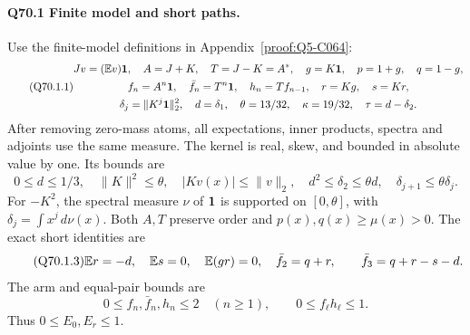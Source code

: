 \paragraph{Q70.1 Finite model and short paths.}
Use the finite-model definitions in Appendix~\ref{proof:Q5-C064}:
\begin{equation}\tag{Q70.1.1}\label{eq:Q70:1.1}
\begin{gathered}
Jv=(\mathbb E v)\mathbf1,\quad A=J+K,\quad T=J-K=A^*,\quad
g=K\mathbf1,\quad p=1+g,\quad q=1-g,\\
f_n=A^n\mathbf1,\quad\bar f_n=T^n\mathbf1,\quad h_n=Tf_{n-1},
\quad r=Kg,\quad s=Kr,\\
\delta_j=\|K^j\mathbf1\|_2^2,\quad d=\delta_1,\quad
\theta=13/32,\quad\kappa=19/32,\quad\tau=d-\delta_2.
\end{gathered}
\end{equation}
After removing zero-mass atoms, all expectations, inner products,
spectra and adjoints use the same measure. The kernel is real,
skew, and bounded in absolute value by one. Its bounds are
\begin{equation}\tag{Q70.1.2}\label{eq:Q70:1.2}
0\le d\le1/3,\quad\|K\|^2\le\theta,\quad
|Kv(x)|\le\|v\|_2,\quad d^2\le\delta_2\le\theta d,\quad
\delta_{j+1}\le\theta\delta_j.
\end{equation}
For \(-K^2\), the spectral measure \(\nu\) of \(\mathbf1\) is
supported on \([0,\allowbreak \theta]\), with \(\delta_j=\allowbreak \int x^j\,\allowbreak d\nu(x)\).
Both \(A,\allowbreak T\) preserve order and \(p(x),\allowbreak q(x)\ge\allowbreak \mu(x)>\allowbreak 0\).
The exact short identities are
\begin{equation}\tag{Q70.1.3}\label{eq:Q70:1.3}
\mathbb E r=-d,\quad\mathbb E s=0,\quad\mathbb E(gr)=0,\quad
\bar f_2=q+r,\qquad\bar f_3=q+r-s-d.
\end{equation}
The arm and equal-pair bounds are
\begin{equation}\tag{Q70.1.4}\label{eq:Q70:1.4}
0\le f_n,\bar f_n,h_n\le2\quad(n\ge1),\qquad
0\le f_\ell h_\ell\le1.
\end{equation}
Thus \(0\le\allowbreak  E_0,\allowbreak E_r\le\allowbreak 1\).


